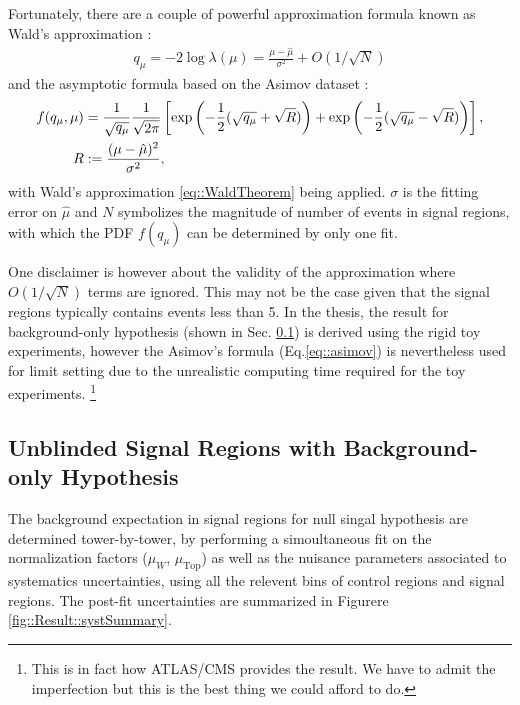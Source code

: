 Fortunately, there are a couple of powerful approximation formula known as Wald's approximation \cite{WaldTheorem}:
\begin{align}
q_\mu = -2 \log\lambda(\mu) = \frac{\mu-\hat{\mu}}{\sigma^2} + O(1/\sqrt{N}) \label{eq::WaldTheorem}
\end{align}
and the asymptotic formula based on the Asimov dataset \cite{AsymptoticAsimov}:
\begin{align}
f(q_\mu,\mu) & = \frac{1}{\sqrt{q_\mu}} \frac{1}{\sqrt{2\pi}} \left[ \exp \left( -\frac{1}{2}(\sqrt{q_\mu}+\sqrt{R}) \right) + \exp \left( -\frac{1}{2}(\sqrt{q_\mu}-\sqrt{R}) \right) \right], \nonumber \\
R & := \frac{(\mu-\hat{\mu})^2}{\sigma^2},
\label{eq::asimov}
\end{align}
with Wald's approximation \ref{eq::WaldTheorem} being applied.  $\sigma$ is the fitting error on $\hat{\mu}$ and $N$ symbolizes the magnitude of number of events in signal regions, with which the PDF $f(q_\mu)$ can be determined by only one fit.

One disclaimer is however about the validity of the approximation where $O(1/\sqrt{N})$ terms are ignored.
This may not be the case given that the signal regions typically contains events less than 5.
In the thesis, the result for background-only hypothesis (shown in Sec. \ref{sed::Result::bgOnly}) is derived using the rigid toy experiments, however the Asimov's formula (Eq.\ref{eq::asimov}) is nevertheless used for limit setting due to the unrealistic computing time required for the toy experiments. 
\footnote{This is in fact how ATLAS/CMS provides the result. We have to admit the imperfection but this is the best thing we could afford to do.}


\clearpage
\subsection{Unblinded Signal Regions with Background-only Hypothesis} \label{sed::Result::bgOnly}
The background expectation in signal regions for null singal hypothesis are determined tower-by-tower, 
by performing a simoultaneous fit on the normalization factors ($\mu_W$, $\mu_{\mathrm{Top}}$) as well as the nuisance parameters associated to systematics uncertainties, 
using all the relevent bins of control regions and signal regions.
The post-fit uncertainties are summarized in Figurere \ref{fig::Result::systSummary}.  \\

